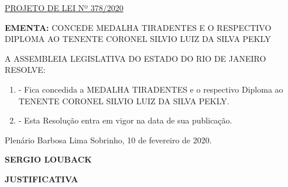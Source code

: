 \documentclass[10pt]{article}
\date{}
\begin{document}
\maketitle
\begin{center}
  \huge
  \vspace{-3cm}\href{http://alerjln1.alerj.rj.gov.br/scpro1923.nsf/9665df2600e114f703256caa00231316/46374430d0e4a1600325850a00569138?OpenDocument}{PROJETO DE LEI Nº 378/2020}
\bigskip
\bigskip
\bigskip
  
\end{center}

\textbf{EMENTA:} 
CONCEDE MEDALHA TIRADENTES E O RESPECTIVO DIPLOMA AO TENENTE CORONEL SILVIO LUIZ DA SILVA PEKLY








\bigskip

\noindent
A ASSEMBLEIA LEGISLATIVA DO ESTADO DO RIO DE JANEIRO RESOLVE:

\begin{enumerate}[label=Art. \arabic*\textdegree]
\item - Fica concedida a MEDALHA TIRADENTES e o respectivo Diploma ao TENENTE CORONEL SILVIO LUIZ DA SILVA PEKLY.

\item - Esta Resolução entra em vigor na data de sua publicação.

\end{enumerate}




\begin{center}
  Plenário Barbosa Lima Sobrinho, 10 de fevereiro de 2020.

   \bigskip

  \textbf{ SERGIO LOUBACK}

  \bigskip

  \textbf{JUSTIFICATIVA}
  \bigskip

\end{center}
\end{document}
